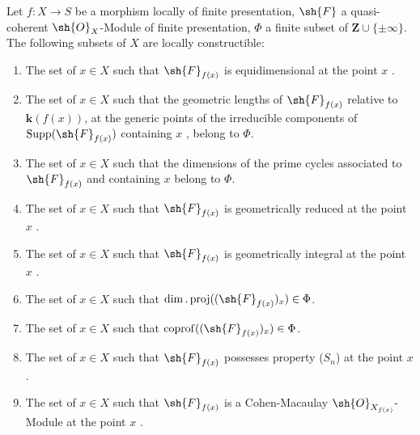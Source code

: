 \begin{proposition}[9.9.2]
\label{IV.9.9.2}
Let $f:X\to S$ be a morphism locally of finite presentation, $\sh{F}$ a quasi-coherent $\sh{O}_X$-Module of finite presentation, $\Phi$ a finite subset of $\mathbf{Z}\cup\{\pm\infty\}$.
The following subsets of $X$ are locally constructible:
\begin{enumerate}[label=(\roman*)]
  \item The set of $x\in X$ such that $\sh{F}_{f(x)}$ is equidimensional at the point $x$ .
  \item The set of $x\in X$ such that the geometric lengths of $\sh{F}_{f(x)}$ relative to $\mathbf{k}(f(x))$, at the generic points of the irreducible components of $\operatorname{Supp}(\sh{F}_{f(x)})$ containing $x$ , belong to $\Phi$.
  \item The set of $x\in X$ such that the dimensions of the prime cycles associated to $\sh{F}_{f(x)}$ and containing $x$ belong to $\Phi$.
  \item The set of $x\in X$ such that $\sh{F}_{f(x)}$ is geometrically reduced at the point $x$ .
  \item The set of $x\in X$ such that $\sh{F}_{f(x)}$ is geometrically integral at the point $x$ .
  \item The set of $x\in X$ such that $\dim.\operatorname{proj}((\sh{F}_{f(x)})_x)\in\Phi$.
  \item The set of $x\in X$ such that $\operatorname{coprof}((\sh{F}_{f(x)})_x)\in\Phi$.
  \item The set of $x\in X$ such that $\sh{F}_{f(x)}$ possesses property ($S_n$) at the point $x$ .
  \item The set of $x\in X$ such that $\sh{F}_{f(x)}$ is a Cohen-Macaulay $\sh{O}_{X_{f(x)}}$-Module at the point $x$ .
\end{enumerate}
\end{proposition}

